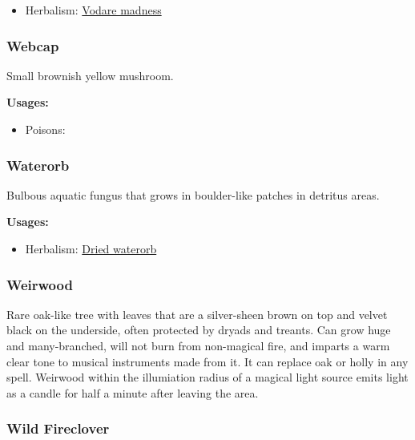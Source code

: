 \begin{itemize}[noitemsep]
\item[] Herbalism: \hyperref[Vodare madness]{Vodare madness}
\end{itemize}

\subsubsection{Webcap}
\label{Webcap}

Small brownish yellow mushroom.

\vspace{5mm}

\textbf{Usages:}

\begin{itemize}[noitemsep]
\item[] Poisons: \poison
\end{itemize}

\subsubsection{Waterorb}
\label{Waterorb}

Bulbous aquatic fungus that grows in boulder-like patches in detritus areas.

\vspace{5mm}

\textbf{Usages:}

\begin{itemize}[noitemsep]
\item[] Herbalism: \hyperref[Dried waterorb]{Dried waterorb}
\end{itemize}

\subsubsection{Weirwood}

Rare oak-like tree with leaves that are a silver-sheen brown on top and velvet black on the underside, often protected by dryads and treants. Can grow huge and many-branched, will not burn from non-magical fire, and imparts a warm clear tone to musical instruments made from it. It can replace oak or holly in any spell. Weirwood within the illumiation radius of a magical light source emits light as a candle for half a minute after leaving the area.

\subsubsection{Wild Fireclover}
\label{Wild Fireclover}

